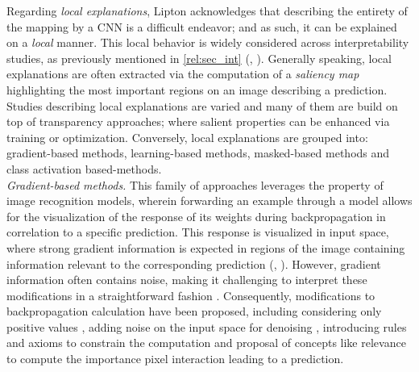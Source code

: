 \noindent Regarding \emph{local explanations}, Lipton acknowledges that describing the entirety of 
the mapping by a CNN is a difficult endeavor; and as such, it can be explained on a 
\emph{local} manner. This local behavior is widely considered across interpretability studies, as 
previously mentioned in \autoref{rel:sec_int} (\cite{guidotti2018survey}, \cite{zhang2021survey}). 
Generally speaking, local explanations are often extracted via the computation of a \emph{saliency 
map} highlighting the most important regions on an image describing a prediction. Studies describing 
local explanations are varied and many of them are build on top of transparency approaches; where 
salient properties can be enhanced via training or optimization. Conversely, local explanations 
are grouped into: gradient-based methods, learning-based methods, masked-based methods and 
class activation based-methods.\\

\noindent \emph{Gradient-based methods.} This family of approaches leverages the property of 
image recognition models, wherein forwarding an example through a model allows for the 
visualization of the response of its weights during backpropagation in correlation to a specific 
prediction. This response is visualized in input space, where strong gradient information is 
expected in regions of the image containing information relevant to the corresponding prediction 
(\cite{baehrens2010explain}, \cite{simonyan2013deep}). However, gradient information often contains 
noise, making it challenging to interpret these modifications in a straightforward fashion 
\autocite{adebayo2018local}. Consequently, modifications to backpropagation calculation have 
been proposed, including considering only positive values \autocite{guidedbackprop}, adding noise 
on the input space for denoising \autocite{smilkov2017smoothgrad}, introducing rules and axioms to 
constrain the computation \autocite{sundararajan2017axiomatic} and proposal of concepts like 
relevance \autocite{bach2015pixel} to compute the importance pixel interaction leading to a 
prediction.\\

